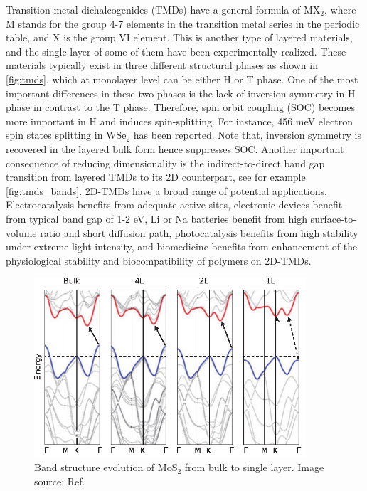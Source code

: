 Transition metal dichalcogenides (TMDs) have a general formula of MX$_2$, where M stands for the group 4-7 elements in the transition metal series in the periodic table, and X is the group VI element. This is another type of layered materials, and the single layer of some of them have been experimentally realized.  These materials typically exist in three different structural phases as shown in \autoref{fig:tmds}, which at monolayer level can be either H or T phase. One of the most important differences in these two phases is the lack of inversion symmetry in H phase in contrast to the T phase. Therefore, spin orbit coupling (SOC) becomes more important in H and induces spin-splitting. For instance, 456 meV electron spin states splitting in WSe$_2$\cite{Zhu2011giant} has been reported. Note that, inversion symmetry is recovered in the layered bulk form hence suppresses SOC. Another important consequence of reducing dimensionality is the indirect-to-direct band gap transition from layered TMDs to its 2D counterpart, see for example \autoref{fig:tmds_bands}. 2D-TMDs have a broad range of potential applications. Electrocatalysis\cite{kim2013enhanced,huang2014synthesis} benefits from adequate active sites, electronic devices\cite{RadisavljevicB2011,sun2014fabrication} benefit from typical band gap of 1-2 eV, Li or Na batteries\cite{chang2011cysteine,chen2013situ} benefit from high surface-to-volume ratio and short diffusion path, photocatalysis benefits from high stability under extreme light intensity\cite{Li2013,Parzinger2015}, and biomedicine benefits from enhancement of the physiological stability and biocompatibility of polymers on 2D-TMDs\cite{Cheng2014,Yin2014}. 



\begin{figure}[htbp!] 
\centering  
\includegraphics[width=0.9\textwidth]{tmds_bands.eps}
\caption[Band structure evolution of MoS$_2$ from bulk to single layer]{Band structure evolution of MoS$_2$ from bulk to single layer. Image source: Ref. \cite{Chhowalla2013}}  
\label{fig:tmds_bands}
\end{figure} 


